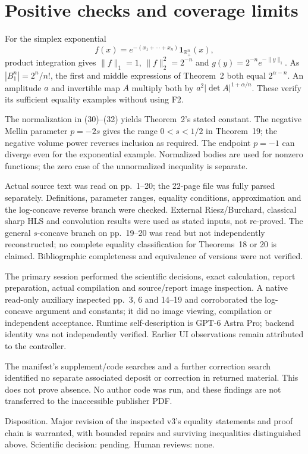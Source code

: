\documentclass[10pt]{article}
\begin{document}
\section*{Positive checks and coverage limits}
For the simplex exponential \[f(x)=e^{-(x_1+\cdots+x_n)}\mathbf 1_{\mathbb R_+^n}(x),\] product integration gives \(\|f\|_1=1\), \(\|f\|_2^2=2^{-n}\) and \(g(y)=2^{-n}e^{-\|y\|_1}\). As \(|B_1^n|=2^n/n!\), the first and middle expressions of Theorem 2 both equal \(2^{\alpha-n}\). An amplitude \(a\) and invertible map \(A\) multiply both by \(a^2|\det A|^{1+\alpha/n}\). These verify its sufficient equality examples without using F2.\par
The normalization in (30)–(32) yields Theorem 2’s stated constant. The negative Mellin parameter \(p=-2s\) gives the range \(0<s<1/2\) in Theorem 19; the negative volume power reverses inclusion as required. The endpoint \(p=-1\) can diverge even for the exponential example. Normalized bodies are used for nonzero functions; the zero case of the unnormalized inequality is separate.\par
Actual source text was read on pp. 1–20; the 22-page file was fully parsed separately. Definitions, parameter ranges, equality conditions, approximation and the log-concave reverse branch were checked. External Riesz/Burchard, classical sharp HLS and convolution results were used as stated inputs, not re-proved. The general \(s\)-concave branch on pp. 19–20 was read but not independently reconstructed; no complete equality classification for Theorems 18 or 20 is claimed. Bibliographic completeness and equivalence of versions were not verified.\par
The primary session performed the scientific decisions, exact calculation, report preparation, actual compilation and source/report image inspection. A native read-only auxiliary inspected pp. 3, 6 and 14–19 and corroborated the log-concave argument and constants; it did no image viewing, compilation or independent acceptance. Runtime self-description is GPT-6 Astra Pro; backend identity was not independently verified. Earlier UI observations remain attributed to the controller.\par
The manifest’s supplement/code searches and a further correction search identified no separate associated deposit or correction in returned material. This does not prove absence. No author code was run, and these findings are not transferred to the inaccessible publisher PDF.\par
Disposition. Major revision of the inspected v3’s equality statements and proof chain is warranted, with bounded repairs and surviving inequalities distinguished above. Scientific decision: pending. Human reviews: none.\par
\end{document}
